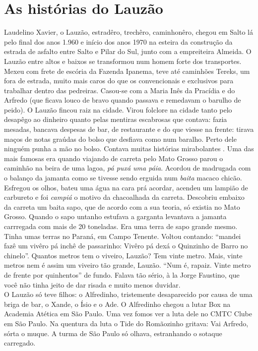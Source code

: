 \documentclass[12pt,brazil,]{book}
\begin{document}
\section{As histórias do Lauzão}\label{as-histuxf3rias-do-lauzuxe3o}

Laudelino Xavier, o Lauzão, estradêro, trechêro, caminhonêro, chegou em
Salto lá pelo final dos anos 1.960 e início dos anos 1970 na esteira da
construção da estrada de asfalto entre Salto e Pilar do Sul, junto com a
empreiteira Almeida. O Lauzão entre altos e baixos se transformou num
homem forte dos transportes. Mexeu com frete de escória da Fazenda
Ipanema, teve até caminhões Tereks, um fora de estrada, muito mais caros
do que os convencionais e exclusivos para trabalhar dentro das
pedreiras. Casou-se com a Maria Inês da Pracídia e do Arfredo (que
ficava louco de bravo quando passava e remedavam o barulho de peido). O
Lauzão fincou raiz na cidade. Virou folclore na cidade tanto pelo
desapêgo ao dinheiro quanto pelas mentiras escabrosas que contava: fazia
mesadas, bancava despesas de bar, de restaurante e do que viesse na
frente: tirava maços de notas graúdas do bolso que desfiava como num
baralho. Perto dele ninguém punha a mão no bolso. Contava muitas
histórias mirabolantes . Uma das mais famosas era quando viajando de
carreta pelo Mato Grosso parou o caminhão na beira de uma lagoa,
\emph{pá puxá uma páia}. Acordou de madrugada com o balanço da jamanta
como se tivesse sendo erguida num \emph{baita} macaco chicão. Esfregou
os olhos, bateu uma água na cara prá acordar, acendeu um lampião de
carbureto e foi \emph{campiá} o motivo da chacoalhada da carreta.
Descobriu embaixo da carreta um baita sapo, que de acordo com a sua
teoria, só existia no Mato Grosso. Quando o sapo untanho estufava a
garganta levantava a jamanta carrregada com mais de 20 toneladas. Era
uma terra de sapo grande mesmo.\\
Tinha umas terras no Paraná, em Campo Tenente. Voltou contando: ``mandei
fazê um vivêro pá inchê de passarinho: Vivêro pá dexá o Quinzinho de
Barro no chinelo''. Quantos metros tem o viveiro, Lauzão? Tem vinte
metro. Mais, vinte metros nem é assim um viveiro tão grande, Lauzão.
``Num é, rapaiz. Vinte metro de frente por quinhentos'' de fundo. Falava
tão sério, à la Jorge Faustino, que você não tinha jeito de dar risada e
muito menos duvidar.\\
O Lauzão só teve filhos: o Alfredinho, tristemente desaparecido por
causa de uma briga de bar, o Xande, o Ísio e o Ade. O Alfredinho chegou
a lutar Box na Academia Atética em São Paulo. Uma vez fomos ver a luta
dele no CMTC Clube em São Paulo. Na quentura da luta o Tide do
Romãozinho gritava: Vai Arfredo, sórta o muque. A turma de São Paulo só
olhava, estranhando o sotaque carregado.
\end{document}
